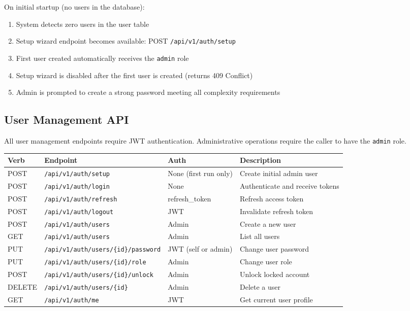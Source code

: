 \documentclass[11pt,a4paper]{article}
\newcommand{\inlinecode}[1]{\texttt{\small\colorbox{ctCodeBg}{#1}}}
\newcommand{\apipath}[1]{\texttt{\small\textcolor{ctAccentBlue}{#1}}}
\begin{document}
On initial startup (no users in the database):

\begin{enumerate}
    \item System detects zero users in the user table
    \item Setup wizard endpoint becomes available: POST \apipath{/api/v1/auth/setup}
    \item First user created automatically receives the \inlinecode{admin} role
    \item Setup wizard is disabled after the first user is created (returns 409 Conflict)
    \item Admin is prompted to create a strong password meeting all complexity requirements
\end{enumerate}

\subsection{User Management API}

\begin{reqbox}
All user management endpoints require JWT authentication. Administrative operations require the caller to have the \inlinecode{admin} role.
\end{reqbox}

\begin{longtable}{@{}p{1.5cm}p{4.5cm}p{3cm}p{5cm}@{}}
\toprule
\textbf{Verb} & \textbf{Endpoint} & \textbf{Auth} & \textbf{Description} \\
\midrule
\endhead
POST & \apipath{/api/v1/auth/setup} & None (first run only) & Create initial admin user \\
POST & \apipath{/api/v1/auth/login} & None & Authenticate and receive tokens \\
POST & \apipath{/api/v1/auth/refresh} & refresh\_token & Refresh access token \\
POST & \apipath{/api/v1/auth/logout} & JWT & Invalidate refresh token \\
POST & \apipath{/api/v1/auth/users} & Admin & Create a new user \\
GET & \apipath{/api/v1/auth/users} & Admin & List all users \\
PUT & \apipath{/api/v1/auth/users/\{id\}/password} & JWT (self or admin) & Change user password \\
PUT & \apipath{/api/v1/auth/users/\{id\}/role} & Admin & Change user role \\
POST & \apipath{/api/v1/auth/users/\{id\}/unlock} & Admin & Unlock locked account \\
DELETE & \apipath{/api/v1/auth/users/\{id\}} & Admin & Delete a user \\
GET & \apipath{/api/v1/auth/me} & JWT & Get current user profile \\
\bottomrule
\end{longtable}
\end{document}
